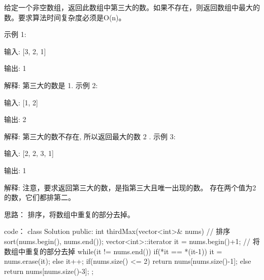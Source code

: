 给定一个非空数组，返回此数组中第三大的数。如果不存在，则返回数组中最大的数。要求算法时间复杂度必须是O(n)。

示例 1:

输入: [3, 2, 1]

输出: 1

解释: 第三大的数是 1.
示例 2:

输入: [1, 2]

输出: 2

解释: 第三大的数不存在, 所以返回最大的数 2 .
示例 3:

输入: [2, 2, 3, 1]

输出: 1

解释: 注意，要求返回第三大的数，是指第三大且唯一出现的数。
存在两个值为2的数，它们都排第二。





















思路：
排序，将数组中重复的部分去掉。


























code：
class Solution {
public:
    int thirdMax(vector<int>& nums) {
        // 排序
        sort(nums.begin(), nums.end());
        vector<int>::iterator it = nums.begin()+1;
        // 将数组中重复的部分去掉
        while(it != nums.end())
        {
            if(*it == *(it-1))
                it = nums.erase(it);
            else it++;
        }
        if(nums.size() <= 2) return nums[nums.size()-1];
        else return nums[nums.size()-3];
    }
};